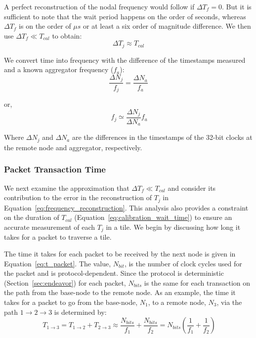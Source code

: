 A perfect reconstruction of the nodal frequency would follow if $\Delta T_{f} = 0$.
But it is sufficient to note that the wait period happens on the order of seconds, whereas $\Delta T_{f}$ is on the order of $\mu s$ or at least a six order of magnitude difference.
We then use $\Delta T_{f} \ll T_{cal}$ to obtain:
\begin{equation}
  \Delta T_{j} \approx T_{cal}
\end{equation}

We convert time into frequency with the difference of the timestamps measured and a known aggregator frequency ($f_{a}$):
\begin{equation}
   \frac{\Delta N_{j}}{f_{j}} = \frac{\Delta N_{a}}{f_{a}}
\end{equation}

or,
\begin{equation}~\label{eq:frequency_reconstruction}
   \boxed{f_{j} \simeq \frac{\Delta N_{j}}{\Delta N_{a}}f_{a}}
\end{equation}

Where $\Delta N_{j}$ and $\Delta N_{a}$ are the differences in the timestamps of the 32-bit clocks at the remote node and aggregator, respectively.


\subsubsection{Packet Transaction Time}
We next examine the approximation that $\Delta T_{f} \ll T_{cal}$ and consider its contribution to the error in the reconstruction of $T_{j}$ in Equation~\ref{eq:frequency_reconstruction}.
This analysis also provides a constraint on the duration of $T_{cal}$ (Equation~\ref{eq:calibration_wait_time}) to ensure an accurate measurement of each $T_{j}$ in a tile.
We begin by discussing how long it takes for a packet to traverse a tile.

The time it takes for each packet to be received by the next node is given in Equation~\ref{eq:t_packet}.
The value, $N_{bit}$, is the number of clock cycles used for the packet and is protocol-dependent.
Since the protocol is deterministic (Section~\ref{sec:endeavor}) for each packet, $N_{bits}$ is the same for each transaction on the path from the base-node to the remote node.
As an example, the time it takes for a packet to go from the base-node, $N_{1}$, to a remote node, $N_{3}$, via the path $1\rightarrow 2 \rightarrow 3$ is determined by:
\begin{equation}~\label{eq:t_packetTransfer}
  T_{1\rightarrow 3} = T_{1\rightarrow 2} + T_{2\rightarrow 3} \approx \frac{N_{bits}}{f_{1}} + \frac{N_{bits}}{f_{2}} = N_{bits}(\frac{1}{f_{1}} + \frac{1}{f_{2}})
\end{equation}

